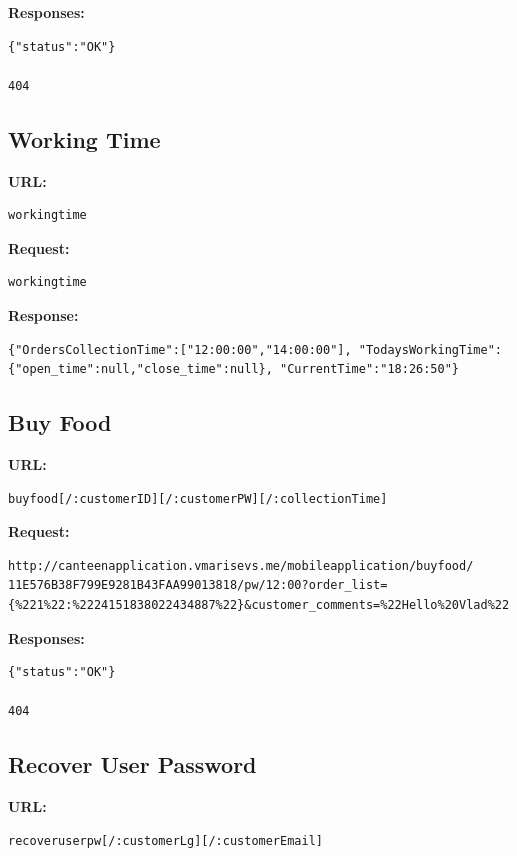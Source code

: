 \textbf{Responses:}
\begin{verbatim}
{"status":"OK"}

404
\end{verbatim}

\subsection*{Working Time}
\textbf{URL:}
\begin{verbatim}
workingtime
\end{verbatim}

\textbf{Request:}
\begin{verbatim}
workingtime
\end{verbatim}

\textbf{Response:}
\begin{verbatim}
{"OrdersCollectionTime":["12:00:00","14:00:00"], "TodaysWorkingTime":{"open_time":null,"close_time":null}, "CurrentTime":"18:26:50"}
\end{verbatim}

\subsection*{Buy Food}
\textbf{URL:}
\begin{verbatim}
buyfood[/:customerID][/:customerPW][/:collectionTime]
\end{verbatim}

\textbf{Request:}
\begin{verbatim}
http://canteenapplication.vmarisevs.me/mobileapplication/buyfood/ 11E576B38F799E9281B43FAA99013818/pw/12:00?order_list= {%221%22:%2224151838022434887%22}&customer_comments=%22Hello%20Vlad%22
\end{verbatim}

\textbf{Responses:}
\begin{verbatim}
{"status":"OK"}

404
\end{verbatim}

\subsection*{Recover User Password}
\textbf{URL:}
\begin{verbatim}
recoveruserpw[/:customerLg][/:customerEmail]
\end{verbatim}

